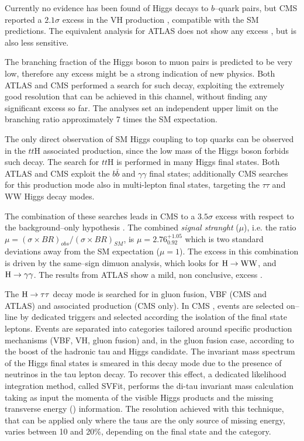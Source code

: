 Currently no evidence has been found of Higgs decays to $b$--quark pairs, but CMS reported a $2.1\sigma$ excess in the VH production \cite{Chatrchyan:2013zna}, compatible with the SM predictions. The equivalent analysis for ATLAS does not show any excess \cite{TheATLAScollaboration:2013lia}, but is also less sensitive.

The branching fraction of the Higgs boson to muon pairs is predicted to be very low, therefore any excess might be a strong indication of new physics. Both ATLAS \cite{Aad:2014xva} and CMS \cite{CMS:2013aga} performed a search for such decay, exploiting the extremely good resolution that can be achieved in this channel, without finding any significant excess so far. The analyses set an independent upper limit on the branching ratio approximately 7 times the SM expectation.

The only direct observation of SM Higgs coupling to top quarks can be observed in the $tt$H associated production, since the low mass of the Higgs boson forbids such decay. The search for $tt$H is performed in many Higgs final states. Both ATLAS and CMS exploit the $b\bar{b}$ and $\gamma\gamma$ final states; additionally CMS searches for this production mode also in multi-lepton final states, targeting the $\tau\tau$ and WW Higgs decay modes.

The combination of these searches leads in CMS to a $3.5\sigma$ excess with respect to the background--only hypothesis \cite{CMS:2014ega}. The combined \emph{signal stranght} ($\mu$), i.e. the ratio $\mu = (\sigma \times BR)_{obs} / (\sigma \times BR)_{SM}$, is $\mu = 2.76^{+1.05}_{0.92}$ which is two standard deviations away from the SM expectation ($\mu = 1$). The excess in this combination is driven by the same--sign dimuon analysis, which looks for $\mathrm{H}\rightarrow \mathrm{W}\mathrm{W}$, and $\mathrm{H}\rightarrow\gamma\gamma$. The results from ATLAS show a mild, non conclusive, excess \cite{ATLASCONF:2014043}.

The $\mathrm{H} \to \tau \tau$ decay mode is searched for in gluon fusion, VBF (CMS and ATLAS) and associated production (CMS only). In CMS \cite{H_tautau}, events are selected on--line by dedicated triggers and selected according the isolation of the final state leptons. Events are separated into categories tailored around specific production mechanisms (VBF, VH, gluon fusion) and, in the gluon fusion case, according to the boost of the hadronic tau and Higgs candidate. The invariant mass spectrum of the Higgs final states is smeared in this decay mode due to the presence of neutrinos in the tau lepton decay. To recover this effect, a dedicated likelihood integration method, called SVFit, performs the di-tau invariant mass calculation taking as input the momenta of the visible Higgs products and the missing transverse energy (\MET) information. The resolution achieved with this technique, that can be applied only where the taus are the only source of missing energy, varies between 10 and 20\%, depending on the final state and the category.

